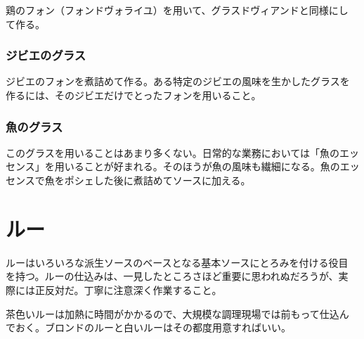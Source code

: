 \begin{recette}
鶏のフォン（フォンドヴォライユ）を用いて、グラスドヴィアンドと同様にし
て作る。

\maeaki

\hypertarget{glace-de-gibier}{%
\subsubsection{ジビエのグラス}\label{glace-de-gibier}}



ジビエのフォンを煮詰めて作る。ある特定のジビエの風味を生かしたグラスを
作るには、そのジビエだけでとったフォンを用いること。

\maeaki

\hypertarget{glace-de-poisson}{%
\subsubsection{魚のグラス}\label{glace-de-poisson}}



このグラスを用いることはあまり多くない。日常的な業務においては「魚のエッ
センス」を用いることが好まれる。そのほうが魚の風味も繊細になる。魚のエッ
センスで魚をポシェした後に煮詰めてソースに加える。
\end{recette}
\hypertarget{roux}{%
\section{ルー}\label{roux}}


 

ルーはいろいろな派生ソースのベースとなる基本ソースにとろみを付ける役目
を持つ。ルーの仕込みは、一見したところさほど重要に思われぬだろうが、実
際には正反対だ。丁寧に注意深く作業すること。

茶色いルーは加熱に時間がかかるので、大規模な調理現場では前もって仕込ん
でおく。ブロンドのルーと白いルーはその都度用意すればいい。

